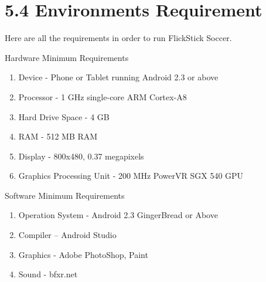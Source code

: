 \documentclass{article}
\begin{document}
\section{5.4 Environments Requirement}
Here are all the requirements in order to run FlickStick Soccer.
\vspace{2mm}

Hardware Minimum Requirements
\begin{enumerate}
\item Device - Phone  or Tablet running Android 2.3 or above
\item Processor - 1 GHz single-core ARM Cortex-A8
\item Hard Drive Space - 4 GB
\item RAM - 512 MB RAM
\item Display - 800x480, 0.37 megapixels
\item Graphics Processing Unit - 200 MHz PowerVR SGX 540 GPU
\end{enumerate}
\vspace{2mm}

Software Minimum Requirements
\begin{enumerate}
\item Operation System - Android 2.3 GingerBread or Above
\item Compiler -- Android Studio
\item Graphics - Adobe PhotoShop, Paint
\item Sound -  bfxr.net
\end{enumerate}
\end{document}
